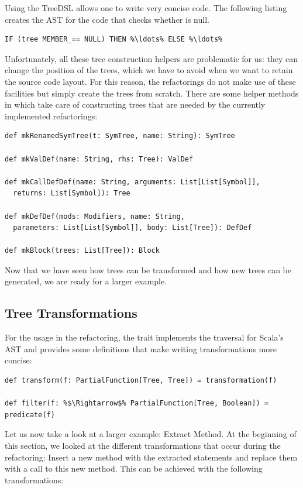 Using the TreeDSL allows one to write very concise code. The following listing creates the AST for the code that checks whether  is null.

\begin{lstlisting}
IF (tree MEMBER_== NULL) THEN %\ldots% ELSE %\ldots%
\end{lstlisting}

Unfortunately, all these tree construction helpers are problematic for us: they can change the position of the trees, which we have to avoid when we want to retain the source code layout. For this reason, the refactorings do not make use of these facilities but simply create the trees from scratch. There are some helper methods in  which take care of constructing trees that are needed by the currently implemented refactorings:

\begin{lstlisting}
def mkRenamedSymTree(t: SymTree, name: String): SymTree

def mkValDef(name: String, rhs: Tree): ValDef

def mkCallDefDef(name: String, arguments: List[List[Symbol]], 
  returns: List[Symbol]): Tree

def mkDefDef(mods: Modifiers, name: String, 
  parameters: List[List[Symbol]], body: List[Tree]): DefDef

def mkBlock(trees: List[Tree]): Block
\end{lstlisting}

Now that we have seen how trees can be transformed and how new trees can be generated, we are ready for a larger example.

\subsection{Tree Transformations}\label{subsection:tree-transformations}

For the usage in the refactoring, the  trait implements the traversal for Scala's AST and provides some definitions that make writing transformations more concise:

\begin{lstlisting}
def transform(f: PartialFunction[Tree, Tree]) = transformation(f)
  
def filter(f: %$\Rightarrow$% PartialFunction[Tree, Boolean]) = predicate(f)
\end{lstlisting}

Let us now take a look at a larger example: Extract Method. At the beginning of this section, we looked at the different transformations that occur during the refactoring: Insert a new method with the extracted statements and replace them with a call to this new method. This can be achieved with the following transformations:

